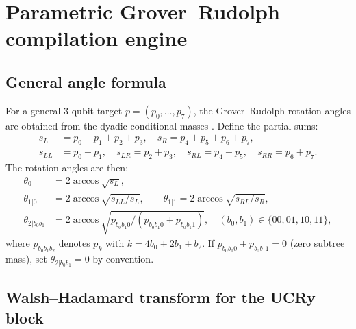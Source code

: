 \documentclass[11pt,a4paper]{article}
\begin{document}
\section{Parametric Grover--Rudolph compilation engine}
\label{sec:gr-engine}

\subsection{General angle formula}

For a general 3-qubit target $p = (p_0, \ldots, p_7)$, the
Grover--Rudolph rotation angles are obtained from the dyadic
conditional masses \cite{GroverRudolph2002,
FalcoFalcoPomaresMatthies2026}. Define the partial sums:
\begin{align}
  s_L &= p_0+p_1+p_2+p_3, \quad s_R = p_4+p_5+p_6+p_7, \\
  s_{LL} &= p_0+p_1, \quad s_{LR} = p_2+p_3, \quad
  s_{RL} = p_4+p_5, \quad s_{RR} = p_6+p_7.
\end{align}
The rotation angles are then:
\begin{align}
  \theta_0 &= 2\arccos\!\sqrt{s_L},
  \label{eq:theta0-gen}\\
  \theta_{1|0} &= 2\arccos\!\sqrt{s_{LL}/s_L}, \qquad
  \theta_{1|1}  = 2\arccos\!\sqrt{s_{RL}/s_R},
  \label{eq:theta1-gen}\\
  \theta_{2|b_0 b_1} &= 2\arccos\!\sqrt{p_{b_0 b_1 0} /
    (p_{b_0 b_1 0} + p_{b_0 b_1 1})},
    \quad (b_0, b_1) \in \{00, 01, 10, 11\},
  \label{eq:theta2-gen}
\end{align}
where $p_{b_0 b_1 b_2}$ denotes $p_k$ with
$k = 4b_0 + 2b_1 + b_2$.
If $p_{b_0 b_1 0} + p_{b_0 b_1 1} = 0$ (zero subtree mass),
set $\theta_{2|b_0 b_1} = 0$ by convention.

\subsection{Walsh--Hadamard transform for the UCRy block}
\end{document}
